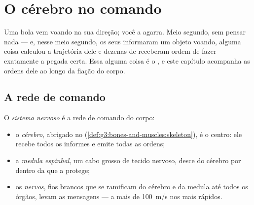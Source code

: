 \chapter{O cérebro no comando}\label{ch:g5:brain-in-command}

Uma bola vem voando na sua direção; você a agarra. Meio segundo,
sem pensar nada --- e, nesse meio segundo, os seus  informaram
um objeto voando, alguma coisa calculou a trajetória dele e dezenas
de  receberam ordem de fazer exatamente a pegada certa. Essa
alguma coisa é o , e este capítulo acompanha as ordens dele ao
longo da fiação do corpo.

\section{A rede de comando}

\begin{definition}\label{def:g5:brain-in-command:system}
O \emph{sistema nervoso} é a rede de comando
do corpo:
\begin{itemize}
  \item o \emph{cérebro}, abrigado no 
        (\cref{def:g3:bones-and-muscles:skeleton}), é o centro: ele
        recebe todos os informes e emite todas as ordens;
  \item a \emph{medula espinhal}, um cabo
        grosso de tecido nervoso, desce do cérebro por dentro da
         que a protege;
  \item os \emph{nervos}, fios brancos que se ramificam
        do cérebro e da medula até todos os órgãos, levam as
        mensagens --- a mais de \qty{100}{m/s} nos mais rápidos.
\end{itemize}
\end{definition}


